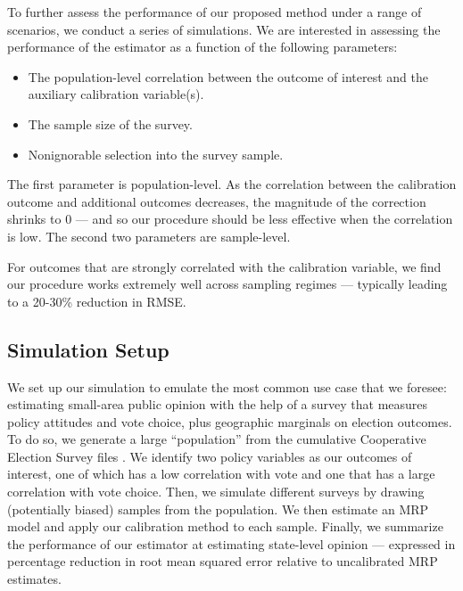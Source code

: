 To further assess the performance of our proposed method under a range of scenarios, we conduct a series of simulations. We are interested in assessing the performance of the estimator as a function of the following parameters:
\begin{itemize}
  \item The population-level correlation between the outcome of interest and the auxiliary calibration variable(s).
  \item The sample size of the survey.
  \item Nonignorable selection into the survey sample. 
\end{itemize}
The first parameter is population-level. As the correlation between the calibration outcome and additional outcomes decreases, the magnitude of the correction shrinks to 0 --- and so our procedure should be less effective when the correlation is low. The second two parameters are sample-level. 

For outcomes that are strongly correlated with the calibration variable, we find our procedure works extremely well across sampling regimes --- typically leading to a 20-30\% reduction in RMSE. 

\subsection{Simulation Setup}

We set up our simulation to emulate the most common use case that we foresee: estimating small-area public opinion with the help of a survey that measures policy attitudes and vote choice, plus geographic marginals on election outcomes. To do so, we generate a large ``population'' from the cumulative Cooperative Election Survey files \citep{CCESCumulative,CCESPolicy}. We identify two policy variables as our outcomes of interest, one of which has a low correlation with vote and one that has a large correlation with vote choice. Then, we simulate different surveys by drawing (potentially biased) samples from the population. We then estimate an MRP model and apply our calibration method to each sample. Finally, we summarize the performance of our estimator at estimating state-level opinion --- expressed in percentage reduction in root mean squared error relative to uncalibrated MRP estimates. 

